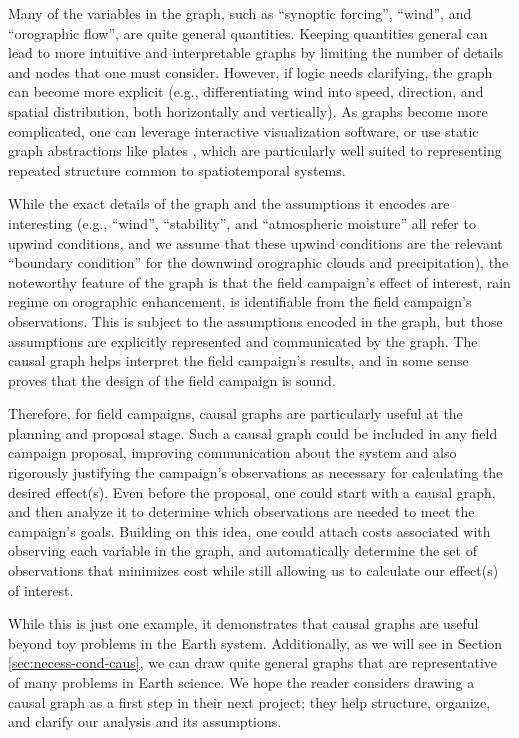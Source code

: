 \documentclass[12pt]{article}
\begin{document}
Many of the variables in the graph, such as ``synoptic forcing'',
``wind'', and ``orographic flow'', are quite general
quantities. Keeping quantities general can lead to more intuitive and
interpretable graphs by limiting the number of details and nodes that
one must consider. However, if logic needs clarifying, the graph can
become more explicit (e.g., differentiating wind into speed,
direction, and spatial distribution, both horizontally and
vertically). As graphs become more complicated, one can leverage
interactive visualization software, or use static graph abstractions
like plates \citep{bishop2006pattern}, which are particularly well
suited to representing repeated structure common to spatiotemporal
systems.

While the exact details of the graph and the assumptions it encodes
are interesting (e.g., ``wind'', ``stability'', and ``atmospheric
moisture'' all refer to upwind conditions, and we assume that these
upwind conditions are the relevant ``boundary condition'' for the
downwind orographic clouds and precipitation), the noteworthy feature
of the graph is that the field campaign's effect of interest, rain
regime on orographic enhancement, is identifiable from the field
campaign's observations. This is subject to the assumptions encoded in
the graph, but those assumptions are explicitly represented and
communicated by the graph. The causal graph helps interpret the field
campaign's results, and in some sense proves that the design of the
field campaign is sound.

Therefore, for field campaigns, causal graphs are particularly useful at the
planning and proposal stage. Such a causal graph could be included in
any field campaign proposal, improving communication about the system
and also rigorously justifying the campaign’s observations as
necessary for calculating the desired effect(s). Even before the
proposal, one could start with a causal graph, and then analyze it to
determine which observations are needed to meet the campaign’s
goals. Building on this idea, one could attach costs associated with
observing each variable in the graph, and automatically determine the
set of observations that minimizes cost while still allowing us to
calculate our effect(s) of interest.

While this is just one example, it demonstrates that causal graphs are
useful beyond toy problems in the Earth system. Additionally, as we
will see in Section \ref{sec:necess-cond-caus}, we can draw quite
general graphs that are representative of many problems in Earth
science. We hope the reader considers drawing a causal graph as a
first step in their next project; they help structure, organize, and
clarify our analysis and its assumptions.
\end{document}
